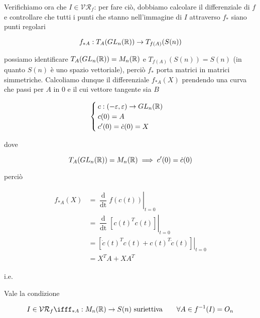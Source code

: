 Verifichiamo ora che $ I \in \mathcal{VR}_{f} $: per fare ciò, dobbiamo calcolare il differenziale di $ f $ e controllare che tutti i punti che stanno nell'immagine di $ I $ attraverso $ f_{*} $ siano punti regolari

\begin{equation}
	f_{*A} : T_{A}(GL_{n}(\mathbb{R})) \to T_{f(A)}(S(n))
\end{equation}

possiamo identificare $ T_{A}(GL_{n}(\mathbb{R})) = M_{n}(\mathbb{R}) $ e $ T_{f(A)}(S(n)) = S(n) $ (in quanto $ S(n) $ è uno spazio vettoriale), perciò $ f_{*} $ porta matrici in matrici simmetriche. Calcoliamo dunque il differenziale $ f_{*A}(X) $ prendendo una curva che passi per $ A $ in 0 e il cui vettore tangente sia $ B $

\begin{equation}
	\begin{cases}
		c : (-\varepsilon,\varepsilon) \to GL_{n}(\mathbb{R})\\
		c(0) = A\\
		c'(0) = \dot{c}(0) = X
	\end{cases}
\end{equation}

dove

\begin{equation}
	T_{A}(GL_{n}(\mathbb{R})) = M_{n}(\mathbb{R}) \implies c'(0) = \dot{c}(0)
\end{equation}

perciò

\begin{align}
	\begin{split}
		f_{*A}(X) &= \left. \dfrac{\operatorname{d}}{\operatorname{dt}} f(c(t)) \right|_{t=0}\\
		&= \left. \dfrac{\operatorname{d}}{\operatorname{dt}} [c(t)^{T} c(t)] \right|_{t=0}\\
		&= \left. [ \dot{c}(t)^{T} c(t) + c(t)^{T} \dot{c}(t) ] \right|_{t=0}\\
		&= X^{T} A + X A^{T}
	\end{split}
\end{align}

i.e.


Vale la condizione

\begin{equation}
	I \in \mathcal{VR}_{f} %
	\iff%
	f_{*A} : M_{n}(\R) \to S(n) \text{ suriettiva} \qquad \forall A \in f^{-1}(I) = O_{n}
\end{equation}

